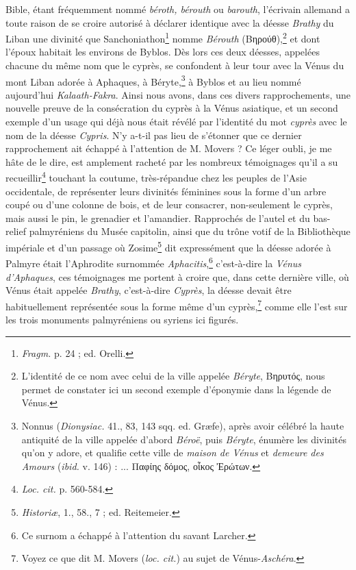\documentclass{article}
\begin{document}
Bible, étant fréquemment nommé \emph{béroth, bérouth} ou \emph{barouth}, l'écrivain allemand a toute raison de se croire autorisé à déclarer identique avec la déesse \emph{Brathy} du Liban une divinité que Sanchoniathon\footnote{\emph{Fragm.} p. 24 ; ed. Orelli.} nomme \emph{Bérouth} (\textgreek{Βηρούθ}),\footnote{L'identité de ce nom avec celui de la ville appelée \emph{Béryte}, \textgreek{Βηρυτός}, nous permet de constater ici un second exemple d'éponymie dans la légende de Vénus.} et dont l'époux habitait les environs de Byblos. Dès lors ces deux déesses, appelées chacune du même nom que le cyprès, se confondent à leur tour avec la Vénus du mont Liban adorée à Aphaques, à Béryte,\footnote{Nonnus (\emph{Dionysiac.} 41., 83, 143 sqq. ed. Græfe), après avoir célébré la haute antiquité de la ville appelée d'abord \emph{Béroë}, puis \emph{Béryte}, énumère les divinités qu'on y adore, et qualifie cette ville de \emph{maison de Vénus} et \emph{demeure des Amours} (\emph{ibid.} v. 146) : ... \textgreek{Παφίης δόμος, οἶκος Ἐρώτων}.} à Byblos et au lieu nommé aujourd'hui \emph{Kalaath-Fakra}. Ainsi nous avons, dans ces divers rapprochements, une nouvelle preuve de la consécration du cyprès à la Vénus asiatique, et un second exemple d'un usage qui déjà nous était révélé par l'identité du mot \emph{cyprès} avec le nom de la déesse \emph{Cypris}. N'y a-t-il pas lieu de s'étonner que ce dernier rapprochement ait échappé à l'attention de M. Movers ? Ce léger oubli, je me hâte de le dire, est amplement racheté par les nombreux témoignages qu'il a su recueillir\footnote{\emph{Loc. cit.} p. 560-584.} touchant la coutume, très-répandue chez les peuples de l'Asie occidentale, de représenter leurs divinités féminines sous la forme d'un arbre coupé ou d'une colonne de bois, et de leur consacrer, non-seulement le cyprès, mais aussi le pin, le grenadier et l'amandier. Rapprochés de l'autel et du bas-relief palmyréniens du Musée capitolin, ainsi que du trône votif de la Bibliothèque impériale et d'un passage où Zosime\footnote{\emph{Historiæ}, 1., 58., 7 ; ed. Reitemeier.} dit expressément que la déesse adorée à Palmyre était l'Aphrodite surnommée \emph{Aphacitis},\footnote{Ce surnom a échappé à l'attention du savant Larcher.} c'est-à-dire la \emph{Vénus d'Aphaques}, ces témoignages me portent à croire que, dans cette dernière ville, où Vénus était appelée \emph{Brathy}, c'est-à-dire \emph{Cyprès}, la déesse devait être habituellement représentée sous la forme même d'un cyprès,\footnote{Voyez ce que dit M. Movers (\emph{loc. cit.}) au sujet de Vénus-\emph{Aschéra}.} comme elle l'est sur les trois monuments palmyréniens ou syriens ici figurés.
\end{document}

